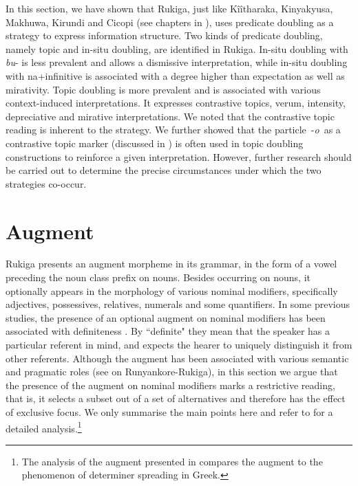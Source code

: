\documentclass[output=paper]{langscibook}
\begin{document}
In this section, we have shown that Rukiga, just like Kîîtharaka, Kinyakyusa, Makhuwa, Kirundi and Cicopi (see chapters in \citealt{langsci-current-book}), uses predicate doubling as a strategy to express information structure. Two kinds of predicate doubling, namely topic and in-situ doubling, are identified in Rukiga. In-situ doubling with \textit{bu}- is less prevalent and allows a dismissive interpretation, while in-situ doubling with na+infinitive is associated with a degree higher than expectation as well as mirativity. Topic doubling is more prevalent and is associated with various context-induced interpretations. It expresses contrastive topics, verum, intensity, depreciative and mirative interpretations. We noted that the contrastive topic reading is inherent to the strategy. We further showed that the particle~-\textit{o}~as a contrastive topic marker (discussed in ) is often used in topic doubling constructions to reinforce a given interpretation. However, further research should be carried out to determine the precise circumstances under which the two strategies co-occur.

\section{Augment}\label{sec:augment}
Rukiga presents an augment morpheme in its grammar, in the form of a vowel preceding the noun class prefix on nouns. Besides occurring on nouns, it optionally appears in the morphology of various nominal modifiers, specifically adjectives, possessives, relatives, numerals and some quantifiers. In some previous studies, the presence of an optional augment on nominal modifiers has been associated with definiteness \citep{MorrisKirwan1972,Taylor1972,Taylor1985}. By ``definite" they mean that the speaker has a particular referent in mind, and expects the hearer to uniquely distinguish it from other referents. Although the augment has been associated with various semantic and pragmatic roles (see \citealt{MorrisKirwan1972,Taylor1972,Taylor1985,Asiimwe2014} on Runyankore-Rukiga), in this section we argue that the presence of the augment on nominal modifiers marks a restrictive reading, that is, it selects a subset out of a set of alternatives \citep{AsiimweEtAl2023} and therefore has the effect of exclusive focus. We only summarise the main points here and refer to \citet{AsiimweEtAl2023} for a detailed analysis.\footnote{The analysis of the augment presented in \citet{AsiimweEtAl2023} compares the augment to the phenomenon of determiner spreading in Greek.} 
\end{document}
